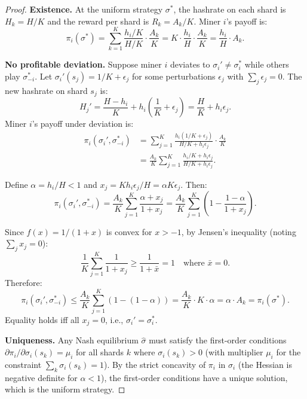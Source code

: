 \documentclass[11pt,a4paper]{article}
\theoremstyle{definition}
\theoremstyle{remark}
\newcommand{\payoff}{\pi}
\newcommand{\strategy}{\sigma}
\newcommand{\hashrate}{h}
\newcommand{\Hashrate}{H}
\newcommand{\reward}{R}
\begin{document}
\begin{proof}
\textbf{Existence.}
At the uniform strategy $\strategy^*$, the hashrate on each shard is
$\Hashrate_k = \Hashrate / K$ and the reward per shard is $\reward_k = A_k / K$.
Miner $i$'s payoff is:
\[
  \payoff_i(\strategy^*) = \sum_{k=1}^{K}
    \frac{\hashrate_i / K}{\Hashrate / K} \cdot \frac{A_k}{K}
  = K \cdot \frac{\hashrate_i}{\Hashrate} \cdot \frac{A_k}{K}
  = \frac{\hashrate_i}{\Hashrate} \cdot A_k.
\]

\textbf{No profitable deviation.}
Suppose miner $i$ deviates to $\strategy_i' \neq \strategy^*_i$ while
others play $\strategy^*_{-i}$.
Let $\strategy_i'(s_j) = 1/K + \epsilon_j$ for some perturbations
$\epsilon_j$ with $\sum_j \epsilon_j = 0$.
The new hashrate on shard $s_j$ is:
\[
  \Hashrate_j' = \frac{\Hashrate - \hashrate_i}{K} + \hashrate_i
  \left(\frac{1}{K} + \epsilon_j\right)
  = \frac{\Hashrate}{K} + \hashrate_i \epsilon_j.
\]
Miner $i$'s payoff under deviation is:
\begin{align*}
  \payoff_i(\strategy_i', \strategy^*_{-i})
  &= \sum_{j=1}^{K} \frac{\hashrate_i (1/K + \epsilon_j)}
     {\Hashrate/K + \hashrate_i \epsilon_j} \cdot \frac{A_k}{K} \\
  &= \frac{A_k}{K} \sum_{j=1}^{K}
     \frac{\hashrate_i / K + \hashrate_i \epsilon_j}
     {\Hashrate / K + \hashrate_i \epsilon_j}.
\end{align*}

Define $\alpha = \hashrate_i / \Hashrate < 1$ and
$x_j = K \hashrate_i \epsilon_j / \Hashrate = \alpha K \epsilon_j$.
Then:
\[
  \payoff_i(\strategy_i', \strategy^*_{-i})
  = \frac{A_k}{K} \sum_{j=1}^{K}
    \frac{\alpha + x_j}{1 + x_j}
  = \frac{A_k}{K} \sum_{j=1}^{K}
    \left(1 - \frac{1 - \alpha}{1 + x_j}\right).
\]

Since $f(x) = 1/(1+x)$ is convex for $x > -1$, by Jensen's inequality
(noting $\sum_j x_j = 0$):
\[
  \frac{1}{K} \sum_{j=1}^{K} \frac{1}{1 + x_j} \geq
  \frac{1}{1 + \bar{x}} = 1
  \quad \text{where } \bar{x} = 0.
\]
Therefore:
\[
  \payoff_i(\strategy_i', \strategy^*_{-i})
  \leq \frac{A_k}{K} \sum_{j=1}^{K} \left(1 - (1-\alpha)\right)
  = \frac{A_k}{K} \cdot K \cdot \alpha
  = \alpha \cdot A_k = \payoff_i(\strategy^*).
\]
Equality holds iff all $x_j = 0$, i.e., $\strategy_i' = \strategy_i^*$.

\textbf{Uniqueness.}
Any Nash equilibrium $\hat{\strategy}$ must satisfy the first-order
conditions $\partial \payoff_i / \partial \strategy_i(s_k) = \mu_i$
for all shards $k$ where $\strategy_i(s_k) > 0$ (with multiplier $\mu_i$
for the constraint $\sum_k \strategy_i(s_k) = 1$).
By the strict concavity of $\payoff_i$ in $\strategy_i$ (the Hessian is
negative definite for $\alpha < 1$), the first-order conditions have a
unique solution, which is the uniform strategy.
\end{proof}
\end{document}
